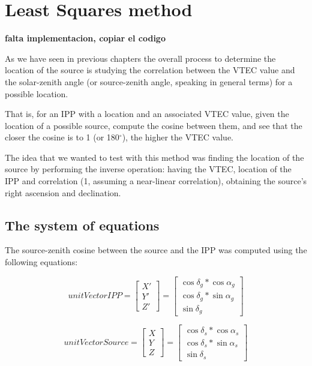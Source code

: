 \chapter{Least Squares method}

\textbf{falta implementacion, copiar el codigo}

As we have seen in previous chapters the overall process to determine the location of the source is studying the correlation between the VTEC value and the solar-zenith angle (or source-zenith angle, speaking in general terms) for a possible location.

That is, for an IPP with a location and an associated VTEC value, given the location of a possible source, compute the cosine between them, and see that the closer the cosine is to 1 (or 180$^{\circ}$), the higher the VTEC value.

The idea that we wanted to test with this method was finding the location of the source by performing the inverse operation: having the VTEC, location of the IPP and correlation (1, assuming a near-linear correlation), obtaining the source's right ascension and declination.

\section{The system of equations}

The source-zenith cosine between the source and the IPP was computed using the following equations:

\begin{equation} \label{eq:61}
unitVectorIPP =
\begin{bmatrix}
X' \\
Y' \\
Z'
\end{bmatrix}
=
\begin{bmatrix}
\cos\delta_{g} * \cos\alpha_{g} \\
\cos\delta_{g} * \sin\alpha_{g} \\
\sin\delta_{g}
\end{bmatrix}
\end{equation}

\begin{equation} \label{eq:62}
unitVectorSource =
\begin{bmatrix}
X \\
Y \\
Z
\end{bmatrix}
=
\begin{bmatrix}
\cos\delta_{s} * \cos\alpha_{s} \\
\cos\delta_{s} * \sin\alpha_{s} \\
\sin\delta_{s}
\end{bmatrix}
\end{equation}

